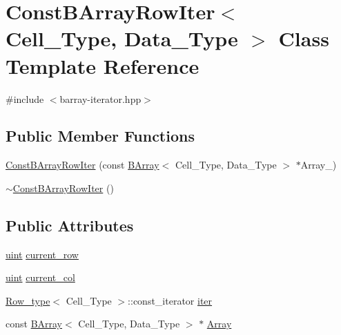 \hypertarget{class_const_b_array_row_iter}{}\section{Const\+B\+Array\+Row\+Iter$<$ Cell\+\_\+\+Type, Data\+\_\+\+Type $>$ Class Template Reference}
\label{class_const_b_array_row_iter}


{\ttfamily \#include $<$barray-\/iterator.\+hpp$>$}

\subsection*{Public Member Functions}
\begin{DoxyCompactItemize}
\item 
\hyperlink{class_const_b_array_row_iter_aa7eb0016052539d179dfe3fc82732f2e}{Const\+B\+Array\+Row\+Iter} (const \hyperlink{class_b_array}{B\+Array}$<$ Cell\+\_\+\+Type, Data\+\_\+\+Type $>$ $\ast$Array\+\_\+)
\item 
\hyperlink{class_const_b_array_row_iter_a5f32704679331be41e994d37294e3476}{$\sim$\+Const\+B\+Array\+Row\+Iter} ()
\end{DoxyCompactItemize}
\subsection*{Public Attributes}
\begin{DoxyCompactItemize}
\item 
\hyperlink{typedefs_8hpp_a91ad9478d81a7aaf2593e8d9c3d06a14}{uint} \hyperlink{class_const_b_array_row_iter_a6e12a5d0e899823179dd469d11f57b1a}{current\+\_\+row}
\item 
\hyperlink{typedefs_8hpp_a91ad9478d81a7aaf2593e8d9c3d06a14}{uint} \hyperlink{class_const_b_array_row_iter_a1cc52bf86768fc2438f1f13df70d3679}{current\+\_\+col}
\item 
\hyperlink{typedefs_8hpp_a83d6ee40a2ba22844108bb8b82e9b951}{Row\+\_\+type}$<$ Cell\+\_\+\+Type $>$\+::const\+\_\+iterator \hyperlink{class_const_b_array_row_iter_ac01a8c0291ccc243bd4363bcbc5122a8}{iter}
\item 
const \hyperlink{class_b_array}{B\+Array}$<$ Cell\+\_\+\+Type, Data\+\_\+\+Type $>$ $\ast$ \hyperlink{class_const_b_array_row_iter_ae7f5ef61225621953a664e73c6153ed3}{Array}
\end{DoxyCompactItemize}


